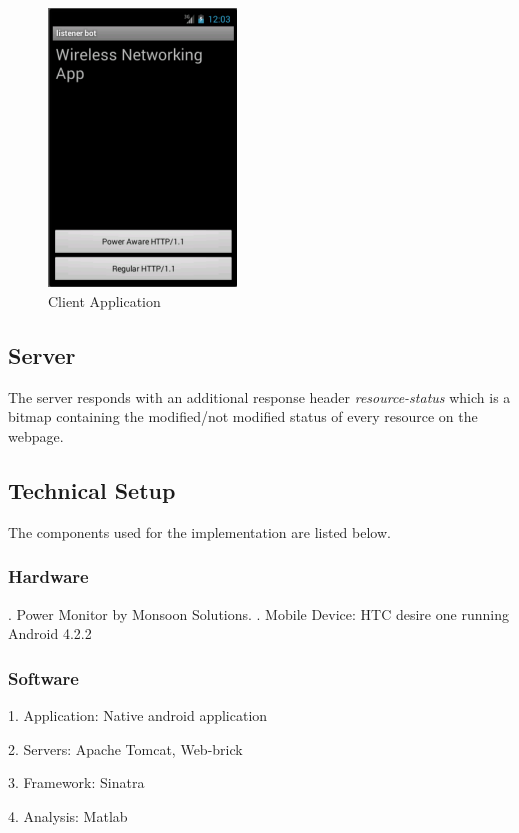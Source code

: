 \documentclass{sigplanconf}
\begin{document}
\begin{figure}[ht!]
\centering
\includegraphics[width=50mm]{app2}
\caption{Client Application }
\label{fig:sp_gd_mnist}
\end{figure}

\subsection{Server}

The server responds with an additional response header {\it resource-status} which is a bitmap containing the modified/not modified status of every resource on the webpage.


\subsection{Technical Setup}
The components used for the implementation are listed below.

\subsubsection{Hardware}

. Power Monitor by Monsoon Solutions. . Mobile Device: HTC desire one running Android 4.2.2

\subsubsection{Software}

1. Application: Native android application

2. Servers: Apache Tomcat, Web-brick

3. Framework: Sinatra

4. Analysis: Matlab
\end{document}
